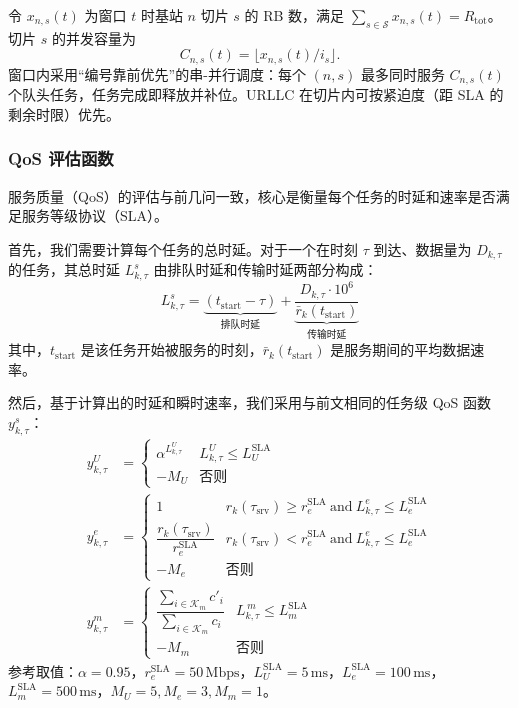 令 $x_{n,s}(t)$ 为窗口 $t$ 时基站 $n$ 切片 $s$ 的 RB 数，满足 $\sum_{s\in\mathcal{S}}x_{n,s}(t)=R_{\text{tot}}$。切片 $s$ 的并发容量为
\begin{equation}
 C_{n,s}(t)=\big\lfloor x_{n,s}(t)/i_s\big\rfloor.
\end{equation}
窗口内采用“编号靠前优先”的串-并行调度：每个 $(n,s)$ 最多同时服务 $C_{n,s}(t)$ 个队头任务，任务完成即释放并补位。URLLC 在切片内可按紧迫度（距 SLA 的剩余时限）优先。

\subsubsection{QoS 评估函数}

服务质量（QoS）的评估与前几问一致，核心是衡量每个任务的时延和速率是否满足服务等级协议（SLA）。

首先，我们需要计算每个任务的总时延。对于一个在时刻 $\tau$ 到达、数据量为 $D_{k,\tau}$ 的任务，其总时延 $L^{s}_{k,\tau}$ 由排队时延和传输时延两部分构成：
\begin{equation}
    L^{s}_{k,\tau} = \underbrace{(t_{\text{start}} - \tau)}_{\text{排队时延}} + \underbrace{\frac{D_{k,\tau} \cdot 10^6}{\bar{r}_k(t_{\text{start}})}}_{\text{传输时延}}
\end{equation}
其中，$t_{\text{start}}$ 是该任务开始被服务的时刻，$\bar{r}_k(t_{\text{start}})$ 是服务期间的平均数据速率。

然后，基于计算出的时延和瞬时速率，我们采用与前文相同的任务级 QoS 函数 $y^{s}_{k,\tau}$：
\begin{align}
 y^{U}_{k,\tau} &= \begin{cases}
 \alpha^{L^{U}_{k,\tau}} & L^{U}_{k,\tau}\le L^{\text{SLA}}_{U}\\
 -M_U & \text{否则}
 \end{cases} \\
y^{e}_{k,\tau} &= \begin{cases}
 1 & r_{k}(\tau_\text{srv})\ge r^{\text{SLA}}_{e}\ \text{and}\ L^{e}_{k,\tau}\le L^{\text{SLA}}_{e}\\
 \dfrac{r_{k}(\tau_\text{srv})}{r^{\text{SLA}}_{e}} & r_{k}(\tau_\text{srv})< r^{\text{SLA}}_{e}\ \text{and}\ L^{e}_{k,\tau}\le L^{\text{SLA}}_{e}\\
 -M_e & \text{否则}
 \end{cases} \\
 y^{m}_{k,\tau} &= \begin{cases}
 \dfrac{\sum\limits_{i\in\mathcal{K}_m}c'_i}{\sum\limits_{i\in\mathcal{K}_m}c_i} & L^{\,m}_{k,\tau}\le L^{\text{SLA}}_{m}\\
 -M_m & \text{否则}
 \end{cases}
\end{align}
参考取值：$\alpha=0.95$，$r^{\text{SLA}}_e=50\,\mathrm{Mbps}$，$L^{\text{SLA}}_{U}=5\,\mathrm{ms}$，$L^{\text{SLA}}_{e}=100\,\mathrm{ms}$，$L^{\text{SLA}}_{m}=500\,\mathrm{ms}$，$M_U=5, M_e=3, M_m=1$。

